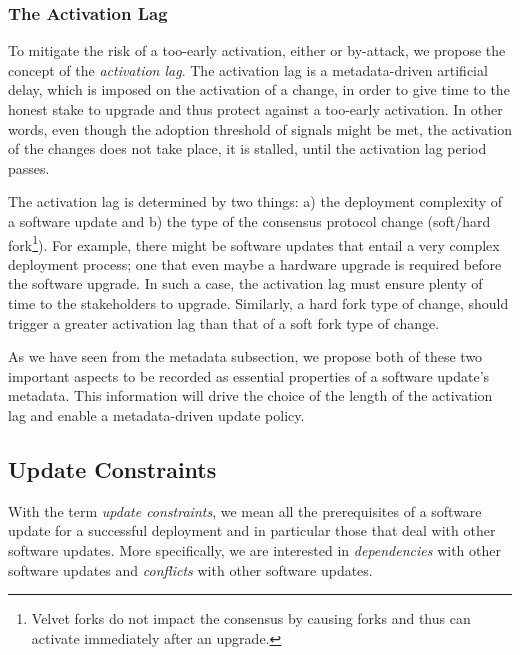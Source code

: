 \subsubsection{The Activation Lag}
To mitigate the risk of a too-early activation, either  or by-attack, we propose the concept of the \emph{activation lag}. The activation lag is a metadata-driven artificial delay, which is imposed on the activation of a change, in order to give time to the honest stake to upgrade and thus protect against a too-early activation. In other words, even though  the adoption threshold of signals might be met, the activation of the changes does not take place, it is stalled, until the activation lag period passes.

The activation lag is determined by two things: a) the deployment complexity of a software update and b) the type of the consensus protocol change (soft/hard fork\footnote{Velvet forks \cite{velvet} do not impact the consensus by causing forks and thus can activate immediately after an upgrade.}).
For example, there might be software updates that entail a very complex deployment process; one that even maybe a hardware upgrade is required before the software upgrade. In such a case, the activation lag must ensure plenty of time to the stakeholders to upgrade. Similarly, a hard fork type of change, should trigger a greater activation lag than that of a soft fork type of change. 

As we have seen from the metadata subsection, we propose both of these two important aspects to be recorded as essential properties of a software update's metadata. This information will drive the choice of the length of the activation lag and enable a metadata-driven update policy.




\subsection{Update Constraints}
With the term \emph{update constraints}, we mean all the prerequisites of a software update for a successful deployment and in particular those that deal with other software updates. 
More specifically, we are interested in \emph{dependencies} with other software updates and \emph{conflicts} with other software updates. 

